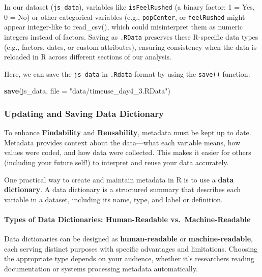 \documentclass[
]{article}
\newenvironment{Shaded}{\begin{snugshade}}{\end{snugshade}}
\newcommand{\AttributeTok}[1]{\textcolor[rgb]{0.13,0.29,0.53}{#1}}
\newcommand{\FunctionTok}[1]{\textcolor[rgb]{0.13,0.29,0.53}{\textbf{#1}}}
\newcommand{\NormalTok}[1]{#1}
\newcommand{\StringTok}[1]{\textcolor[rgb]{0.31,0.60,0.02}{#1}}
\begin{document}
In our dataset (\texttt{js\_data}), variables like \texttt{isFeelRushed}
(a binary factor: 1 = Yes, 0 = No) or other categorical variables (e.g.,
\texttt{popCenter}, or \texttt{feelRushed} might appear integer-like to
read\_csv(), which could misinterpret them as numeric integers instead
of factors. Saving as \texttt{.RData} preserves these R-specific data
types (e.g., factors, dates, or custom attributes), ensuring consistency
when the data is reloaded in R across different sections of our
analysis.

Here, we can save the \texttt{js\_data} in \texttt{.Rdata} format by
using the \texttt{save()} function:

\begin{Shaded}
\begin{Highlighting}[]
\FunctionTok{save}\NormalTok{(js\_data, }\AttributeTok{file =} \StringTok{"data/timeuse\_day4\_3.RData"}\NormalTok{)}
\end{Highlighting}
\end{Shaded}

\subsubsection{Updating and Saving Data
Dictionary}\label{updating-and-saving-data-dictionary}

To enhance \textbf{Findability} and \textbf{Reusability}, metadata must
be kept up to date. Metadata provides context about the data---what each
variable means, how values were coded, and how data were collected. This
makes it easier for others (including your future self!) to interpret
and reuse your data accurately.

One practical way to create and maintain metadata in R is to use a
\textbf{data dictionary}. A data dictionary is a structured summary that
describes each variable in a dataset, including its name, type, and
label or definition.

\paragraph{Types of Data Dictionaries: Human-Readable
vs.~Machine-Readable}\label{types-of-data-dictionaries-human-readable-vs.-machine-readable}

Data dictionaries can be designed as \textbf{human-readable} or
\textbf{machine-readable}, each serving distinct purposes with specific
advantages and limitations. Choosing the appropriate type depends on
your audience, whether it's researchers reading documentation or systems
processing metadata automatically.
\end{document}
